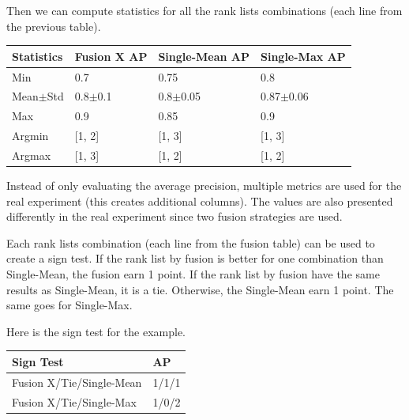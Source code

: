 \begin{example*}
  \vspace{0.5cm}

  Then we can compute statistics for all the rank lists combinations (each line from the previous table).

  \vspace{0.2cm}

  \begin{center}
    \begin{tabular}{l|l l l}
      \toprule
      Statistics        & Fusion X AP   & Single-Mean AP  & Single-Max AP\\
      \midrule
      Min               & 0.7         & 0.75            & 0.8 \\
      Mean$\pm$Std      & 0.8$\pm$0.1 & 0.8$\pm$0.05    & 0.87$\pm$0.06 \\
      Max               & 0.9         & 0.85            & 0.9 \\
      Argmin            & [1, 2]      & [1, 3]          & [1, 3] \\
      Argmax            & [1, 3]      & [1, 2]          & [1, 2] \\
      \bottomrule
    \end{tabular}
  \end{center}

  \vspace{0.2cm}

  Instead of only evaluating the average precision, multiple metrics are used for the real experiment (this creates additional columns).
  The values are also presented differently in the real experiment since two fusion strategies are used.

  \vspace{0.5cm}

  Each rank lists combination (each line from the fusion table) can be used to create a sign test.
  If the rank list by fusion is better for one combination than Single-Mean, the fusion earn 1 point.
  If the rank list by fusion have the same results as Single-Mean, it is a tie.
  Otherwise, the Single-Mean earn 1 point.
  The same goes for Single-Max.

  Here is the sign test for the example.

  \vspace{0.2cm}

  \begin{center}
    \begin{tabular}{l|l }
      \toprule
      Sign Test                & AP\\
      \midrule
      Fusion X/Tie/Single-Mean & 1/1/1 \\
      Fusion X/Tie/Single-Max  & 1/0/2 \\
      \bottomrule
    \end{tabular}
  \end{center}

\end{example*}


